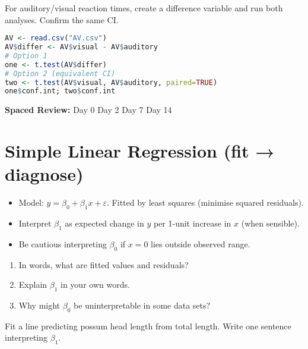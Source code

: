 \documentclass[11pt,a4paper]{article}
\newcommand{\reviewticks}{
  \vspace{0.4em}
  \noindent\scriptsize\textbf{Spaced Review:}
  \fbox{\phantom{D0}} Day 0\quad
  \fbox{\phantom{D2}} Day 2\quad
  \fbox{\phantom{D7}} Day 7\quad
  \fbox{\phantom{D14}} Day 14
}
\begin{document}
\begin{practicebox}
For auditory/visual reaction times, create a difference variable and run both analyses. Confirm the same CI.
\end{practicebox}

\begin{rbox}
\begin{lstlisting}[language=R]
AV <- read.csv("AV.csv")
AV$differ <- AV$visual - AV$auditory
# Option 1
one <- t.test(AV$differ)
# Option 2 (equivalent CI)
two <- t.test(AV$visual, AV$auditory, paired=TRUE)
one$conf.int; two$conf.int
\end{lstlisting}
\end{rbox}

\reviewticks

\section{Simple Linear Regression (fit → diagnose)}

\begin{corebox}
\begin{itemize}
  \item Model: \( y = \beta_0 + \beta_1 x + \varepsilon \). Fitted by least squares (minimise squared residuals).
  \item Interpret \(\beta_1\) as expected change in \(y\) per 1-unit increase in \(x\) (when sensible).
  \item Be cautious interpreting \(\beta_0\) if \(x=0\) lies outside observed range.
\end{itemize}
\end{corebox}

\begin{recallbox}
\begin{enumerate}
  \item In words, what are fitted values and residuals?
  \item Explain \(\beta_1\) in your own words.
  \item Why might \(\beta_0\) be uninterpretable in some data sets?
\end{enumerate}
\end{recallbox}

\begin{practicebox}
Fit a line predicting possum head length from total length. Write one sentence interpreting \(\beta_1\).
\end{practicebox}
\end{document}

